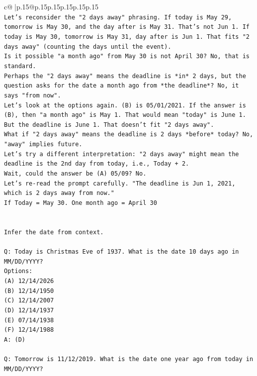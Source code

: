 \documentclass{article}
\begin{document}
{\begin{supertabular}{c@{$\;$}|p{.15\linewidth}@{}p{.15\linewidth}p{.15\linewidth}p{.15\linewidth}p{.15\linewidth}p{.15\linewidth}}
{{{\\ 
\texttt{Let's reconsider the "2 days away" phrasing. If today is May 29, tomorrow is May 30, and the day after is May 31. That's not Jun 1. If today is May 30, tomorrow is May 31, day after is Jun 1. That fits "2 days away" (counting the days until the event).} \\
\texttt{Is it possible "a month ago" from May 30 is not April 30? No, that is standard.} \\
\texttt{Perhaps the "2 days away" means the deadline is *in* 2 days, but the question asks for the date a month ago from *the deadline*? No, it says "from now".} \\
\texttt{Let's look at the options again. (B) is 05/01/2021. If the answer is (B), then "a month ago" is May 1. That would mean "today" is June 1. But the deadline is June 1. That doesn't fit "2 days away".} \\
\texttt{What if "2 days away" means the deadline is 2 days *before* today? No, "away" implies future.} \\
\texttt{Let's try a different interpretation: "2 days away" might mean the deadline is the 2nd day from today, i.e., Today + 2.} \\
\texttt{Wait, could the answer be (A) 05/09? No.} \\
\texttt{Let's re{-}read the prompt carefully. "The deadline is Jun 1, 2021, which is 2 days away from now."} \\
\texttt{If Today = May 30. One month ago = April 30} \\
\\ 
\\ 
\texttt{Infer the date from context.} \\
\\ 
\texttt{Q: Today is Christmas Eve of 1937. What is the date 10 days ago in MM/DD/YYYY?} \\
\texttt{Options:} \\
\texttt{(A) 12/14/2026} \\
\texttt{(B) 12/14/1950} \\
\texttt{(C) 12/14/2007} \\
\texttt{(D) 12/14/1937} \\
\texttt{(E) 07/14/1938} \\
\texttt{(F) 12/14/1988} \\
\texttt{A: (D)} \\
\\ 
\texttt{Q: Tomorrow is 11/12/2019. What is the date one year ago from today in MM/DD/YYYY?} \\
}}}
\end{supertabular}}
\end{document}
